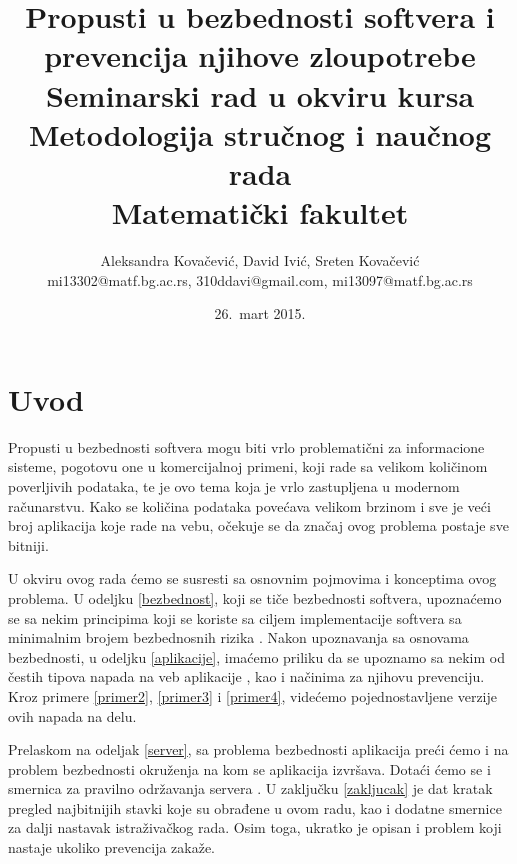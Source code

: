 \documentclass[a4paper]{article}
\begin{document}
\title{Propusti u bezbednosti softvera i prevencija njihove zloupotrebe\\ \small{Seminarski rad u okviru kursa\\Metodologija stručnog i naučnog rada\\ Matematički fakultet}}

\author{Aleksandra Kovačević, David Ivić, Sreten Kovačević\\ mi13302@matf.bg.ac.rs, 310ddavi@gmail.com, mi13097@matf.bg.ac.rs}
\date{26.~mart 2015.}

\maketitle


\tableofcontents

\newpage

\section{Uvod}

Propusti u bezbednosti softvera mogu biti vrlo problematični za informacione sisteme, pogotovu one u komercijalnoj primeni, koji rade sa velikom količinom poverljivih podataka, te je ovo tema koja je vrlo zastupljena u modernom računarstvu. Kako se količina podataka povećava velikom brzinom i sve je veći broj aplikacija koje rade na vebu, očekuje se da značaj ovog problema postaje sve bitniji.

U okviru ovog rada ćemo se susresti sa osnovnim pojmovima i konceptima ovog problema. U odeljku \ref{bezbednost}, koji se tiče bezbednosti softvera, upoznaćemo se sa nekim principima koji se koriste sa ciljem implementacije softvera sa minimalnim brojem bezbednosnih rizika \cite{BIS}. Nakon upoznavanja sa osnovama bezbednosti, u odeljku \ref{aplikacije}, imaćemo priliku da se upoznamo sa nekim od čestih tipova napada na veb aplikacije \cite{SQL, XSS, AC}, kao i načinima za njihovu prevenciju. Kroz primere \ref{primer2}, \ref{primer3} i \ref{primer4}, videćemo pojednostavljene verzije ovih napada na delu.

Prelaskom na odeljak \ref{server}, sa problema bezbednosti aplikacija preći ćemo i na problem bezbednosti okruženja na kom se aplikacija izvršava. Dotaći ćemo se i smernica za pravilno održavanja servera \cite{WS}. U zaklju\v{c}ku \ref{zakljucak} je dat kratak pregled najbitnijih stavki koje su obrađene u ovom radu, kao i dodatne smernice za dalji nastavak istraživačkog rada. Osim toga, ukratko je opisan i problem koji nastaje ukoliko prevencija zakaže.
\end{document}
